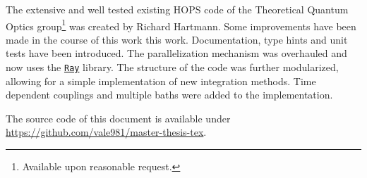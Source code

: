 The extensive and well tested existing HOPS code of the Theoretical
Quantum Optics group\footnote{Available upon reasonable request.} was
created by Richard Hartmann. Some improvements have been made in the
course of this work this work.  Documentation, type hints and unit
tests have been introduced. The parallelization mechanism was
overhauled and now uses the \href{https://www.ray.io}{\texttt{Ray}}
library. The structure of the code was further modularized, allowing
for a simple implementation of new integration methods. Time dependent
couplings and multiple baths were added to the implementation.

The source code of this document is available under
\url{https://github.com/vale981/master-thesis-tex}.
